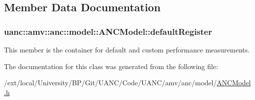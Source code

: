 \subsection{Member Data Documentation}
\subsubsection[{\texorpdfstring{default\+Register}{defaultRegister}}]{ uanc\+::amv\+::anc\+::model\+::\+A\+N\+C\+Model\+::default\+Register}\hypertarget{classuanc_1_1amv_1_1anc_1_1model_1_1_a_n_c_model_a1e7a3078128b1b92eda1e0bbfbfaa610}{}\label{classuanc_1_1amv_1_1anc_1_1model_1_1_a_n_c_model_a1e7a3078128b1b92eda1e0bbfbfaa610}
This member is the container for default and custom performance measurements. 

The documentation for this class was generated from the following file\+:\begin{DoxyCompactItemize}
\item 
/ext/local/\+University/\+B\+P/\+Git/\+U\+A\+N\+C/\+Code/\+U\+A\+N\+C/amv/anc/model/\hyperlink{_a_n_c_model_8h}{A\+N\+C\+Model.\+h}\end{DoxyCompactItemize}
